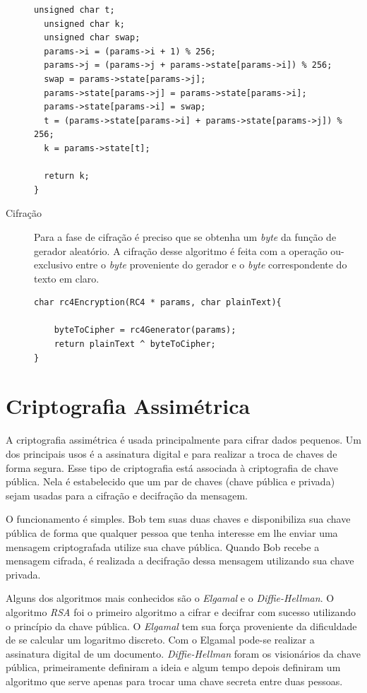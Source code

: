 \begin{description}
\begin{lstlisting}[caption={Código Geração Aleatório de \textit{bytes}}, label=randomGeneration]
  unsigned char t;
  unsigned char k;
  unsigned char swap;
  params->i = (params->i + 1) % 256;
  params->j = (params->j + params->state[params->i]) % 256;
  swap = params->state[params->j];
  params->state[params->j] = params->state[params->i];
  params->state[params->i] = swap;
  t = (params->state[params->i] + params->state[params->j]) % 256;
  k = params->state[t];

  return k;
}
    \end{lstlisting}

	\item [Cifração] Para a fase de cifração é preciso que se obtenha um \textit{byte} da função de gerador aleatório. A cifração desse algoritmo é feita com a operação ou-exclusivo entre o \textit{byte} proveniente do gerador e o \textit{byte} correspondente do texto em claro.

    \begin{lstlisting}[caption={Código Cifração de \textit{bytes}}, label=encryption]
char rc4Encryption(RC4 * params, char plainText){

	byteToCipher = rc4Generator(params);
	return plainText ^ byteToCipher;
}
    \end{lstlisting}

\end{description}


%
\section{Criptografia Assimétrica}
\label{assymmetric-cryptography}

%
A criptografia assimétrica é usada principalmente para cifrar dados pequenos. Um dos principais usos é a assinatura digital e para realizar a troca de chaves de forma segura. Esse tipo de criptografia está associada à criptografia de chave pública. Nela é estabelecido que um par de chaves (chave pública e privada) sejam usadas para a cifração e decifração da mensagem. 

%
O funcionamento é simples. Bob tem suas duas chaves e disponibiliza sua chave pública de forma que qualquer pessoa que tenha interesse em lhe enviar uma mensagem criptografada utilize sua chave pública. Quando Bob recebe a mensagem cifrada, é realizada a decifração dessa mensagem utilizando sua chave privada.

%
Alguns dos algoritmos mais conhecidos são o \textit{Elgamal} e o \textit{Diffie-Hellman}. O algoritmo \textit{RSA} foi o primeiro algoritmo a cifrar e decifrar com sucesso utilizando o princípio da chave pública. O \textit{Elgamal} tem sua força proveniente da dificuldade de se calcular um logaritmo discreto. Com o Elgamal pode-se realizar a assinatura digital de um documento. \textit{Diffie-Hellman} foram os visionários da chave pública, primeiramente definiram a ideia e algum tempo depois definiram um algoritmo que serve apenas para trocar uma chave secreta entre duas pessoas. 


